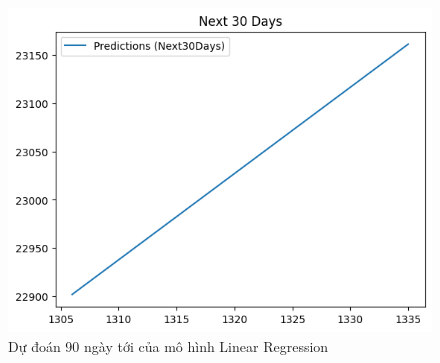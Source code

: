 \begin{figure}[H]
\begin{minipage}{0.15\textwidth}
    \includegraphics[width=1\textwidth]{resources/chapter-5/newdata/predicted/EIB_LinearRegression_9-1 30 DAYS.png}
    \end{minipage}
    \hfill
    
    \caption{Dự đoán 90 ngày tới của mô hình Linear Regression}
    \label{fig:linear_regression_predicted}
\end{figure}

